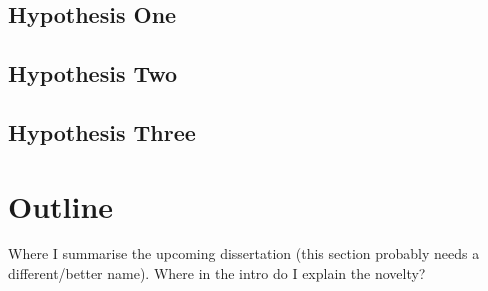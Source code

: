 \subsection{Hypothesis One}

\subsection{Hypothesis Two}

\subsection{Hypothesis Three}

\section{Outline}
Where I summarise the upcoming dissertation (this section probably needs a different/better name).  Where in the intro do I explain the novelty?